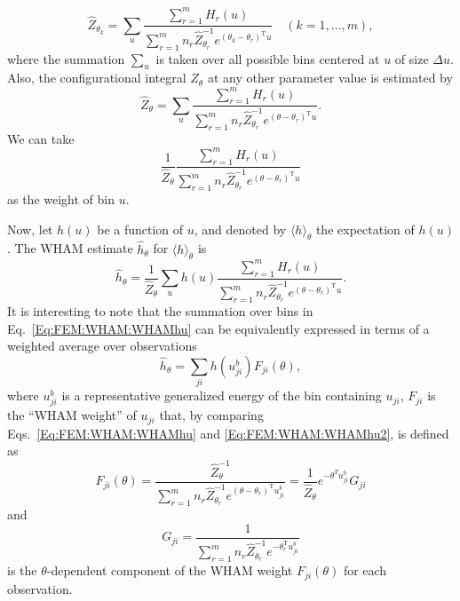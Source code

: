 \begin{equation}
    \hat{Z}_{\theta_k}=\sum_{u}\frac{\sum_{r=1}^m H_r(u)}{\sum_{r=1}^m n_r\hat{Z}_{\theta_r}^{-1}e^{(\theta_k-\theta_r)^\mathrm{T}u}}\quad (k=1,\dots,m),
    \label{Eq:FEM:WHAM:binnedZ}
\end{equation}
where the summation $\sum_u$ is taken over all possible bins centered at $u$ of size $\Delta u$. Also, the configurational integral $Z_\theta$ at any other parameter value is estimated by
\begin{equation}
    \hat{Z}_\theta=\sum_{u}\frac{\sum_{r=1}^m H_r(u)}{\sum_{r=1}^m n_r\hat{Z}_{\theta_r}^{-1}e^{(\theta-\theta_r)^\mathrm{T}u}}.
    \label{Eq:FEM:WHEM:binweight1}
\end{equation}
We can take
\begin{equation}
    \frac{1}{\hat{Z}_\theta}\frac{\sum_{r=1}^m H_r(u)}{\sum_{r=1}^m n_r\hat{Z}_{\theta_r}^{-1}e^{(\theta-\theta_r)^\mathrm{T}u}}
    \label{Eq:FEM:WHEM:binweight2}
\end{equation}
as the weight of bin $u$.

Now, let $h(u)$ be a function of $u$, and denoted by $\langle h\rangle_\theta$ the expectation of $h(u)$. The WHAM estimate $\hat{h}_\theta$ for $\langle h\rangle_\theta$ is
\begin{equation}
    \hat{h}_\theta=\frac{1}{\hat{Z}_\theta}\sum_u h(u) \frac{\sum_{r=1}^m H_r(u)}{\sum_{r=1}^m n_r\hat{Z}_{\theta_r}^{-1}e^{(\theta-\theta_r)^\mathrm{T}u}}.
    \label{Eq:FEM:WHAM:WHAMhu}
\end{equation}
It is interesting to note that the summation over bins in Eq.~\ref{Eq:FEM:WHAM:WHAMhu} can be equivalently expressed in terms of a weighted average over observations
\begin{equation}
    \hat{h}_{\theta}=\sum_{ji}h(u_{ji}^b)F_{ji}(\theta),
    \label{Eq:FEM:WHAM:WHAMhu2}
\end{equation}
where $u_{ji}^b$ is a representative generalized energy of the bin containing $u_{ji}$, $F_{ji}$ is the ``WHAM weight'' of $u_{ji}$ that, by comparing Eqs.~\ref{Eq:FEM:WHAM:WHAMhu} and \ref{Eq:FEM:WHAM:WHAMhu2}, is defined as
\begin{equation}
    F_{ji}(\theta)=\frac{\hat{Z}_\theta^{-1}}{\sum_{r=1}^mn_r\hat{Z}_{\theta_r}^{-1}e^{(\theta-\theta_r)^\mathrm{T}u_{ji}^b}}=\frac{1}{\hat{Z}_\theta}e^{-\theta^Tu_{ji}^b}G_{ji}
    \label{Eq:FEM:WHAM:sampleW}
\end{equation}
and 
\begin{equation}
    G_{ji}=\frac{1}{\sum_{r=1}^m n_r\hat{Z}_{\theta_r}^{-1}e^{-\theta_r^\mathrm{T}u_{ji}^b}}
\end{equation}
is the $\theta$-dependent component of the WHAM weight $F_{ji}(\theta)$ for each observation.

